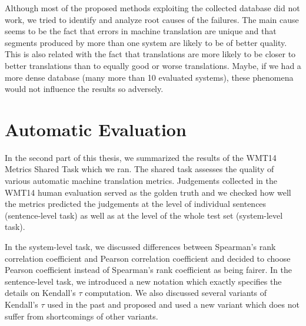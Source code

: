 Although most of the proposed methods exploiting the collected database did not
work, we tried to identify and analyze root causes of the failures. The main
cause seems to be the fact that errors in machine translation are unique and
that segments produced by more than one system are likely to be of better
quality. This is also related with the fact that translations are more likely
to be closer to better translations than to equally good or worse translations.
Maybe, if we had a more dense database (many more than 10 evaluated systems),
these phenomena would not influence the results so adversely.

\section{Automatic Evaluation}

In the second part of this thesis, we summarized the results of the WMT14
Metrics Shared Task which we ran. The shared task assesses the quality of
various automatic machine translation metrics. Judgements collected in the
WMT14 human evaluation served as the golden truth and we checked how well the
metrics predicted the judgements at the level of individual sentences
(sentence-level task) as well as at the level of the whole test set
(system-level task).

In the system-level task, we discussed differences between Spearman's rank
correlation coefficient and Pearson correlation coefficient and decided to
choose Pearson coefficient instead of Spearman's rank coefficient as being
fairer. In the sentence-level task, we introduced a new notation which exactly
specifies the details on Kendall's $\tau$ computation. We also discussed
several variants of Kendall's $\tau$ used in the past and proposed and used a
new variant which does not suffer from shortcomings of other variants.

\begin{comment}
Although sentence-level correlations are significantly higher than they were in
the previous years, they are still much lower than system-level ones. Kendall's
$\tau$ reaches at most 0.45 for the best performing metric in the best language
pair. So, there is quite some research work to be done.

On the system level, the best performing metrics on average in directions into
English are \metric{DiscoTK-party-tuned}, \metric{LAYERED} and
\metric{UPC-STOUT}. The best performing metrics in directions out of English
are \metric{NIST}, \metric{CDER} and \metric{AMBER}. On the sentence level, the
best performing metrics in directions into English are
\metric{DiscoTK-party-tuned}, \metric{BEER} and \metric{REDcombSent}. The best
performing metrics in directions out of English are \metric{BEER},
\metric{Meteor} and \metric{AMBER}.
\end{comment}

